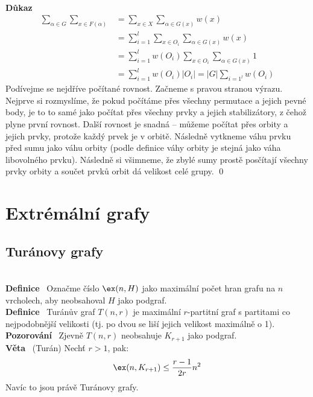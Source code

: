 \documentclass{article}
\renewcommand{\paragraph}[1]{\ \\\smallskip\noindent\textbf{#1}\ }
\begin{document}
\paragraph{Důkaz}
\begin{align}
	\sum_{\alpha\in G} \sum_{x\in F(\alpha)} &= \sum_{x \in X} \sum_{\alpha \in 
	G(x)} w(x) \\
	&=\sum_{i=1}^l \sum_{x \in O_i} \sum_{\alpha \in G(x)} w(x) \\
	&= \sum_{i=1}^l w(O_i) \sum_{x\in O_i} \sum_{\alpha \in G(x)} 1 \\
	&= \sum_{i=1}^l w(O_i) |O_i| = |G| \sum_{i=1^l} w(O_i)
\end{align}
Podívejme se nejdříve počítané rovnost. Začneme s pravou stranou výrazu. Nejprve 
si rozmyslíme, že pokud počítáme přes všechny permutace a jejich pevné body, je 
to to samé jako počítat přes všechny prvky a jejich stabilizátory, z čehož plyne 
první rovnost. Další rovnost je snadná -- můžeme počítat přes orbity a jejich 
prvky, protože každý prvek je v orbitě. Následně vytkneme váhu prvku před sumu 
jako váhu orbity (podle definice váhy orbity je stejná jako váha libovolného 
prvku). Následně si všimneme, že zbylé sumy prostě posčítají všechny prvky 
orbity a součet prvků orbit dá velikost celé grupy. \qed

\section{Extrémální grafy}
\subsection{Turánovy grafy}
\paragraph{Definice}
Označme číslo $\ex(n, H)$ jako maximální počet hran grafu na $n$ vrcholech, aby 
neobsahoval $H$ jako podgraf.
\paragraph{Definice}
Turánův graf $T(n, r)$ je maximální $r$-partitní graf s partitami co 
nejpodobnější velikosti (tj. po dvou se liší jejich velikost maximálně o 1).
\paragraph{Pozorování} Zjevně $T(n,r)$ neobsahuje $K_{r+1}$ jako podgraf.
\paragraph{Věta} (Turán) Nechť $r > 1$, pak:
\begin{align}\ex(n, K_{r+1}) \leq \frac{r-1}{2r} n^2\end{align}
Navíc to jsou právě Turánovy grafy.
\end{document}
